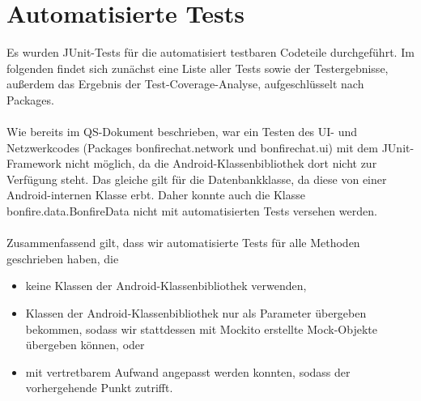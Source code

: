 





\section{Automatisierte Tests}

Es wurden JUnit-Tests für die automatisiert testbaren Codeteile durchgeführt.
Im folgenden findet sich zunächst eine Liste aller Tests sowie der Testergebnisse,
außerdem das Ergebnis der Test-Coverage-Analyse, aufgeschlüsselt nach Packages.
\\\\
Wie bereits im QS-Dokument beschrieben, war ein Testen des UI- und Netzwerkcodes
(Packages bonfirechat.network und bonfirechat.ui)
mit dem JUnit-Framework nicht möglich, da die Android-Klassenbibliothek dort nicht
zur Verfügung steht. Das gleiche gilt für die Datenbankklasse, da diese von einer
Android-internen Klasse erbt. Daher konnte auch die Klasse bonfire.data.BonfireData
nicht mit automatisierten Tests versehen werden.
\\\\
Zusammenfassend gilt, dass wir automatisierte Tests für alle Methoden geschrieben haben,
die
\begin{itemize}
\item keine Klassen der Android-Klassenbibliothek verwenden,
\item Klassen der Android-Klassenbibliothek nur als Parameter übergeben bekommen,
sodass wir stattdessen mit Mockito erstellte Mock-Objekte übergeben können, oder
\item mit vertretbarem Aufwand angepasst werden konnten, sodass der vorhergehende Punkt zutrifft.
\end{itemize}








